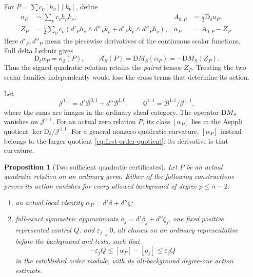 \documentclass[11pt,a4paper]{article}
\newcommand{\MathEqref}[1]{{\hypersetup{linkcolor=EquationLink}\eqref{#1}}}
\newtheorem{proposition}[theorem]{Proposition}
\theoremstyle{definition}
\theoremstyle{remark}
\numberwithin{equation}{section}
\newcommand{\D}{\mathrm D}
\newcommand{\A}{\mathcal A}
\newcommand{\B}{\mathscr B}
\begin{document}
For $P=\sum c_\nu[h_\nu][k_\nu]$, define
\begin{align}
 u_P&=\sum_\nu c_\nu h_\nu k_\nu,
 &A_{0,P}&=\frac12\D_\delta u_P,\nonumber\\
 Z_P&=\frac12\sum_\nu c_\nu
 (d'_Ph_\nu\wedge d''_Pk_\nu+d'_Pk_\nu\wedge d''_Ph_\nu),
 &\alpha_P&=A_{0,P}-Z_P.
                         \label{eq:quadratic-energy}
\end{align}
Here $d'_P,d''_P$ mean the piecewise derivatives of the continuous
scalar functions.  Full delta Leibniz gives
\begin{equation}
          \D_\delta\alpha_P=\kappa_2(P),\qquad
          \A_S(P)=\D M_S(\alpha_P)=-\D M_S(Z_P).
                         \label{eq:quadratic-return}
\end{equation}
Thus the signed quadratic relation retains the \emph{paired} tensor
$Z_P$.  Treating the two scalar families independently would lose the
cross terms that determine its action.

Let
\begin{equation}
 \mathscr J^{1,1}=d'\B^{0,1}+d''\B^{1,0},\qquad
 \mathscr Q^{1,1}=\B^{1,1}/\mathscr J^{1,1},
                         \label{eq:first-order-quotient}
\end{equation}
where the sums are images in the ordinary sheaf category.  The operator
$\D M_S$ vanishes on $\mathscr J^{1,1}$.  For an actual zero relation
$P$, its class $[\alpha_P]$ lies in the Aeppli quotient
$\ker\D_\delta/\mathscr J^{1,1}$.  For a general nonzero quadratic
curvature, $[\alpha_P]$ instead belongs to the larger quotient
\MathEqref{eq:first-order-quotient}; its derivative is that curvature.

\begin{proposition}[Two sufficient quadratic certificates]
\label{prop:certificates}
Let $P$ be an actual quadratic relation on an ordinary germ.  Either
of the following constructions proves its action vanishes for every
allowed background of degree $p\le n-2$:
\begin{enumerate}
\item an actual local identity
      $\alpha_P=d'\beta+d''\zeta$;
\item full-exact symmetric approximants $a_j=d'\beta_j+d''\zeta_j$,
      one fixed positive represented control $Q$, and
      $\varepsilon_j\downarrow0$, all chosen on an ordinary
      representative before the background and tests, such that
      \begin{equation}
       -\varepsilon_jQ\le[\alpha_P]-[a_j]\le\varepsilon_jQ
                       \label{eq:controlled-exact}
      \end{equation}
      in the established order module, with its all-background
      degree-one action estimate.
\end{enumerate}
\end{proposition}
\end{document}
